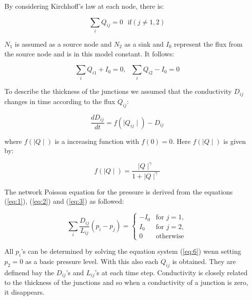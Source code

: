 \documentclass[11pt]{scrartcl}
\begin{document}
By considering Kirchhoff's law at each node, there is:

\begin{equation}
	\label{eq:2}
	\sum_{i} Q_{ij}=0 \,\,\,\, \mathrm{if} \left(j\ne 1,2\right)
\end{equation}

$N_1$ is assumed as a source node and $N_2$ as a sink and $I_0$ represent the flux from the source node and is in this model constant. It follows:

\begin{equation}
	\label{eq:3}
	\sum_{i} Q_{i1}+I_0=0, \,\,\,\, \sum_{i} Q_{i2}-I_0=0
\end{equation}

To describe the thickness of the junctions we assumed that the conductivity $D_{ij}$ changes in time according to the flux $Q_{ij}$:

\begin{equation}
	\label{eq:4}
	\frac{dD_{ij}}{dt}=f\left(\mid Q_{ij} \mid \right)-D_{ij}
\end{equation}

where $f\left(\mid Q \mid \right)$ is a increasing function with $f(0)=0$. Here $f\left(\mid Q \mid \right)$ is given by:

\begin{equation}
	\label{eq:5}
	f\left(\mid Q \mid \right)=\frac{\mid Q \mid^\gamma }{1+\mid Q \mid^\gamma}
\end{equation}

The network Poisson equation for the pressure is derived from the equations (\ref{eq:1}), (\ref{eq:2}) and (\ref{eq:3}) as followed:

\begin{equation}
	\label{eq:6}
	\sum_{i} \frac{D_{ij}}{L_{ij}}\left(p_i-p_j\right)= \begin{cases}
										-I_0 & \mathrm{for}\,\, j=1,\\
										I_0 & \mathrm{for} \,\,j=2,\\
										0 & \mathrm{otherwise}
										\end{cases}
\end{equation}

All $p_i$'s can be determined by solving the equation system (\ref{eq:6}) wenn setting $p_2=0$ as a basic pressure level. With this also each $Q_{ij}$ is obtained. They are definend bay the $D_{ij}$'s and $L_{ij}$'s  at each time step. Conductivity is closely related to the thickness of the junctions and so when a conductivity of a junction is zero, it disappears.
\end{document}
